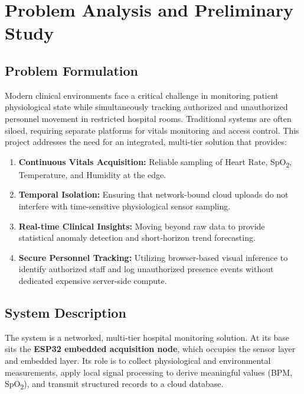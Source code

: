 \chapter{Problem Analysis and Preliminary Study}

\section{Problem Formulation}
Modern clinical environments face a critical challenge in monitoring patient physiological state while simultaneously tracking authorized and unauthorized personnel movement in restricted hospital rooms. Traditional systems are often siloed, requiring separate platforms for vitals monitoring and access control. This project addresses the need for an integrated, multi-tier solution that provides:
\begin{enumerate}
	\item \textbf{Continuous Vitals Acquisition:} Reliable sampling of Heart Rate, SpO\textsubscript{2}, Temperature, and Humidity at the edge.
    \item \textbf{Temporal Isolation:} Ensuring that network-bound cloud uploads do not interfere with time-sensitive physiological sensor sampling.
    \item \textbf{Real-time Clinical Insights:} Moving beyond raw data to provide statistical anomaly detection and short-horizon trend forecasting.
    \item \textbf{Secure Personnel Tracking:} Utilizing browser-based visual inference to identify authorized staff and log unauthorized presence events without dedicated expensive server-side compute.
\end{enumerate}

\section{System Description}

The system is a networked, multi-tier hospital monitoring solution.
At its base sits the \textbf{ESP32 embedded acquisition node}\cite{esp32_datasheet}, which occupies the
sensor layer and embedded layer. Its role is to collect physiological and environmental
measurements, apply local signal processing to derive meaningful values (BPM,
SpO\textsubscript{2}), and transmit structured records to a cloud database.

